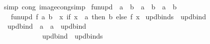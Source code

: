 \begin{isabellebody}
\ {\isacharparenleft}{\kern0pt}simp\ cong{\isacharcolon}{\kern0pt}\ image{\isacharunderscore}{\kern0pt}cong{\isacharunderscore}{\kern0pt}simp{\isacharparenright}{\kern0pt}%
\endisatagproof
{\isafoldproof}%
%
\isadelimproof
\isanewline
%
\endisadelimproof
\isanewline
{}\isamarkupfalse%
%
\isadelimdocument
%
\endisadelimdocument
%
\isatagdocument
%
\isamarkuptrue%
%
\endisatagdocument
{\isafolddocument}%
%
\isadelimdocument
%
\endisadelimdocument
{}\isamarkupfalse%
\ fun{\isacharunderscore}{\kern0pt}upd\ {\isacharcolon}{\kern0pt}{\isacharcolon}{\kern0pt}\ {\isachardoublequoteopen}{\isacharparenleft}{\kern0pt}{\isacharprime}{\kern0pt}a\ {\isasymRightarrow}\ {\isacharprime}{\kern0pt}b{\isacharparenright}{\kern0pt}\ {\isasymRightarrow}\ {\isacharprime}{\kern0pt}a\ {\isasymRightarrow}\ {\isacharprime}{\kern0pt}b\ {\isasymRightarrow}\ {\isacharparenleft}{\kern0pt}{\isacharprime}{\kern0pt}a\ {\isasymRightarrow}\ {\isacharprime}{\kern0pt}b{\isacharparenright}{\kern0pt}{\isachardoublequoteclose}\isanewline
\ \ \ {\isachardoublequoteopen}fun{\isacharunderscore}{\kern0pt}upd\ f\ a\ b\ {\isacharequal}{\kern0pt}\ {\isacharparenleft}{\kern0pt}{\isasymlambda}x{\isachardot}{\kern0pt}\ if\ x\ {\isacharequal}{\kern0pt}\ a\ then\ b\ else\ f\ x{\isacharparenright}{\kern0pt}{\isachardoublequoteclose}\isanewline
\isanewline
{}\isamarkupfalse%
\ updbinds\ \ updbind\isanewline
\isanewline
{}\isamarkupfalse%
\isanewline
\ \ {\isachardoublequoteopen}{\isacharunderscore}{\kern0pt}updbind{\isachardoublequoteclose}\ {\isacharcolon}{\kern0pt}{\isacharcolon}{\kern0pt}\ {\isachardoublequoteopen}{\isacharprime}{\kern0pt}a\ {\isasymRightarrow}\ {\isacharprime}{\kern0pt}a\ {\isasymRightarrow}\ updbind{\isachardoublequoteclose}\ \ \ \ \ \ \ \ \ \ \ \ \ {\isacharparenleft}{\kern0pt}{\isachardoublequoteopen}{\isacharparenleft}{\kern0pt}{}{\isacharunderscore}{\kern0pt}\ {\isacharcolon}{\kern0pt}{\isacharequal}{\kern0pt}{\isacharslash}{\kern0pt}\ {\isacharunderscore}{\kern0pt}{\isacharparenright}{\kern0pt}{\isachardoublequoteclose}{\isacharparenright}{\kern0pt}\isanewline
\ \ {\isachardoublequoteopen}{\isachardoublequoteclose}\ \ \ \ \ \ \ \ \ {\isacharcolon}{\kern0pt}{\isacharcolon}{\kern0pt}\ {\isachardoublequoteopen}updbind\ {\isasymRightarrow}\ updbinds{\isachardoublequoteclose}\ \ \ \ \ \ \ \ \ \ \ \ \ {\isacharparenleft}{\kern0pt}{\isachardoublequoteopen}{\isacharunderscore}{\kern0pt}{\isachardoublequoteclose}{\isacharparenright}{\kern0pt}\isanewline

\end{isabellebody}
